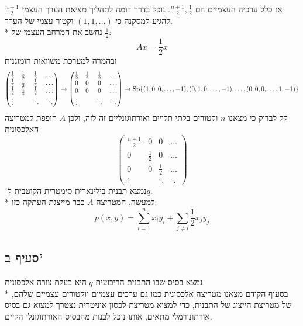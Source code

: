 אז כלל ערכיה העצמיים הם $\frac{n + 1}{2}, \frac{1}{2}$.
נוכל בדרך דומה לתהליך מציאת הערך העצמי $\frac{n + 1}{2}$ להגיע למסקנה כי $(1, 1, \hdots)$ וקטור עצמי של הערך. \\*
נחשב את המרחב העצמי של $\frac{1}{2}$:
\[
	A x = \frac{1}{2} x
\]
ובהמרה למערכת משוואות הומוגנית
\[
	\begin{pmatrix}
		\frac{1}{2} & \frac{1}{2} & \frac{1}{2} & \hdots \\
		\frac{1}{2} & \frac{1}{2} & \frac{1}{2} & \hdots \\
		\frac{1}{2} & \frac{1}{2} & \frac{1}{2} & \hdots \\
		\vdots & & \ddots & \ddots
	\end{pmatrix}
	\rightarrow
	\begin{pmatrix}
		\frac{1}{2} & \frac{1}{2} & \frac{1}{2} & \hdots \\
		0 & 0 & 0 & \hdots \\
		0 & 0 & 0 & \hdots \\
		\vdots & & \ddots & \ddots
	\end{pmatrix}
	\rightarrow
	\operatorname{Sp}\{ (1, 0, 0, \hdots, -1), (0, 1, 0, \hdots, -1), \hdots, (0, 0, 0, \hdots, 1, -1) \}
\]
קל לבדוק כי מצאנו $n$ וקטורים בלתי תלויים ואורתוגונליים זה לזה, ולכן $A$ חופפת למטריצה האלכסונית
\[
	\begin{pmatrix}
		\frac{n + 1}{2}  & 0 & 0 & \hdots \\
		0 & \frac{1}{2} & 0 & \hdots \\
		0 & 0 & \frac{1}{2} & \hdots \\
		\vdots & & \ddots & \ddots
	\end{pmatrix}
\]
נמצא תבנית בילינארית סימטרית הקוטבית ל־$q$. \\*
למעשה, המטריצה $A$ כבר מייצגת העתקה כזו:
\[
	p(x, y) = \sum_{i = 1}^n x_i y_i + \sum_{j \ne i} \frac{1}{2} x_j y_j
\]

\subsection{סעיף ב'}
נמצא בסיס שבו התבנית הריבועית $q$ היא בעלת צורה אלכסונית. \\*
בסעיף הקודם מצאנו מטריצה אלכסונית כמו גם ערכים עצמיים ווקטורים עצמיים שלהם, של מטריצת הייצוג של התבנית,
כדי למצוא מטריצת לכסון אוניטרית נצטרך למצוא גם בסיס אורתונורמלי מתאים, אותו נוכל לבנות מהבסיס האורתוגונלי הקיים.
	

